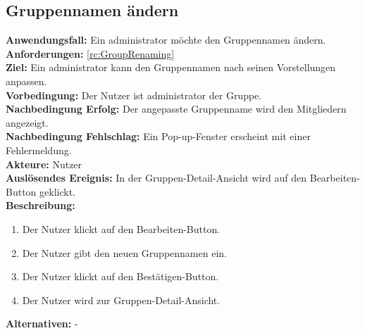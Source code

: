 \documentclass[parskip=full]{scrartcl}
\begin{document}
\subsection{Gruppennamen ändern}
\textbf{Anwendungsfall:} Ein \Gls{administrator} möchte den Gruppennamen ändern.\\
\textbf{Anforderungen:} \ref{rc:GroupRenaming}\\
\textbf{Ziel:} Ein \Gls{administrator} kann den Gruppennamen nach seinen Vorstellungen anpassen.\\
\textbf{Vorbedingung:} Der Nutzer ist \Gls{administrator} der Gruppe.\\
\textbf{Nachbedingung Erfolg:} Der angepasste Gruppenname wird den Mitgliedern angezeigt.\\
\textbf{Nachbedingung Fehlschlag:} Ein Pop-up-Fenster erscheint mit einer Fehlermeldung.\\
\textbf{Akteure:} Nutzer\\
\textbf{Auslösendes Ereignis:} In der Gruppen-Detail-Ansicht wird auf den Bearbeiten-Button geklickt.\\
\textbf{Beschreibung:}
\begin{enumerate}
    \item Der Nutzer klickt auf den Bearbeiten-Button.
    \item Der Nutzer gibt den neuen Gruppennamen ein.
    \item Der Nutzer klickt auf den Bestätigen-Button.
    \item Der Nutzer wird zur Gruppen-Detail-Ansicht.
\end{enumerate}
\textbf{Alternativen:} -
\end{document}

